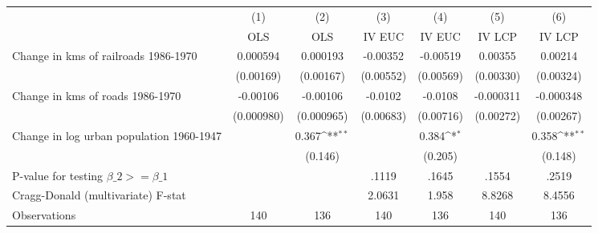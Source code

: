 {
\def\sym#1{\ifmmode^{#1}\else\(^{#1}\)\fi}
\begin{tabular}{l*{6}{c}}
\hline\hline
                &\multicolumn{1}{c}{(1)}&\multicolumn{1}{c}{(2)}&\multicolumn{1}{c}{(3)}&\multicolumn{1}{c}{(4)}&\multicolumn{1}{c}{(5)}&\multicolumn{1}{c}{(6)}\\
                &\multicolumn{1}{c}{OLS}&\multicolumn{1}{c}{OLS}&\multicolumn{1}{c}{IV EUC}&\multicolumn{1}{c}{IV EUC}&\multicolumn{1}{c}{IV LCP}&\multicolumn{1}{c}{IV LCP}\\
\hline
Change in kms of railroads 1986-1970& 0.000594         & 0.000193         & -0.00352         & -0.00519         &  0.00355         &  0.00214         \\
                &(0.00169)         &(0.00167)         &(0.00552)         &(0.00569)         &(0.00330)         &(0.00324)         \\
[1em]
Change in kms of roads 1986-1970& -0.00106         & -0.00106         &  -0.0102         &  -0.0108         &-0.000311         &-0.000348         \\
                &(0.000980)         &(0.000965)         &(0.00683)         &(0.00716)         &(0.00272)         &(0.00267)         \\
[1em]
Change in log urban population 1960-1947&                  &    0.367\sym{**} &                  &    0.384\sym{*}  &                  &    0.358\sym{**} \\
                &                  &  (0.146)         &                  &  (0.205)         &                  &  (0.148)         \\
\hline
P-value for testing $\beta\_{2} >= \beta\_{1}$&                  &                  &    .1119         &    .1645         &    .1554         &    .2519         \\
Cragg-Donald (multivariate) F-stat&                  &                  &   2.0631         &    1.958         &   8.8268         &   8.4556         \\
Observations    &      140         &      136         &      140         &      136         &      140         &      136         \\
\hline\hline
\end{tabular}
}
